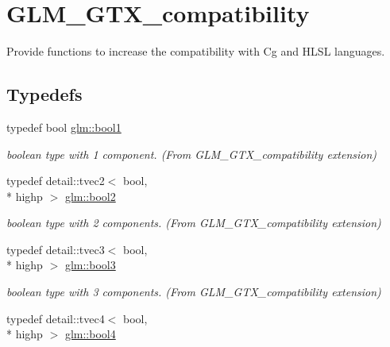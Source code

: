 \hypertarget{group__gtx__compatibility}{\section{G\-L\-M\-\_\-\-G\-T\-X\-\_\-compatibility}
\label{group__gtx__compatibility}
}


Provide functions to increase the compatibility with Cg and H\-L\-S\-L languages.  


\subsection*{Typedefs}
\begin{DoxyCompactItemize}
\item 
\hypertarget{group__gtx__compatibility_gab65f19f5170f95a2f06d6aa6482c9405}{typedef bool \hyperlink{group__gtx__compatibility_gab65f19f5170f95a2f06d6aa6482c9405}{glm\-::bool1}}\label{group__gtx__compatibility_gab65f19f5170f95a2f06d6aa6482c9405}

\begin{DoxyCompactList}\small\item\em boolean type with 1 component. (From G\-L\-M\-\_\-\-G\-T\-X\-\_\-compatibility extension) \end{DoxyCompactList}\item 
\hypertarget{group__gtx__compatibility_gafede6e8549e9bb9da63f404022298d40}{typedef detail\-::tvec2$<$ bool, \\*
highp $>$ \hyperlink{group__gtx__compatibility_gafede6e8549e9bb9da63f404022298d40}{glm\-::bool2}}\label{group__gtx__compatibility_gafede6e8549e9bb9da63f404022298d40}

\begin{DoxyCompactList}\small\item\em boolean type with 2 components. (From G\-L\-M\-\_\-\-G\-T\-X\-\_\-compatibility extension) \end{DoxyCompactList}\item 
\hypertarget{group__gtx__compatibility_gad18ebb149851844fd704e138c4af9a44}{typedef detail\-::tvec3$<$ bool, \\*
highp $>$ \hyperlink{group__gtx__compatibility_gad18ebb149851844fd704e138c4af9a44}{glm\-::bool3}}\label{group__gtx__compatibility_gad18ebb149851844fd704e138c4af9a44}

\begin{DoxyCompactList}\small\item\em boolean type with 3 components. (From G\-L\-M\-\_\-\-G\-T\-X\-\_\-compatibility extension) \end{DoxyCompactList}\item 
\hypertarget{group__gtx__compatibility_ga6ef1f104d22f384c4d59f2b1ca1768a7}{typedef detail\-::tvec4$<$ bool, \\*
highp $>$ \hyperlink{group__gtx__compatibility_ga6ef1f104d22f384c4d59f2b1ca1768a7}{glm\-::bool4}}\label{group__gtx__compatibility_ga6ef1f104d22f384c4d59f2b1ca1768a7}


\end{DoxyCompactItemize}
